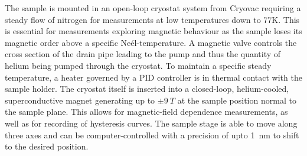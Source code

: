 The sample is mounted in an open-loop cryostat system from Cryovac requiring a steady flow of nitrogen for measurements at low temperatures down to 77K.
This is essential for measurements exploring magnetic behaviour as the sample loses its magnetic order above a specific Neél-temperature.
A magnetic valve controls the cross section of the drain pipe leading to the pump and thus the quantity of helium being pumped through the cryostat.
To maintain a specific steady temperature, a heater governed by a PID controller is in thermal contact with the sample holder.
The cryostat itself is inserted into a closed-loop, helium-cooled, superconductive magnet generating up to $\pm\qty{9}{T}$ at the sample position normal to the sample plane.
This allows for magnetic-field dependence measurements, as well as for recording of hysteresis curves.
The sample stage is able to move along three axes and can be computer-controlled with a precision of upto \qty{1}{nm} to shift to the desired position.

